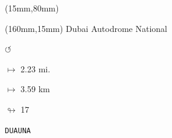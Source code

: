 \begin{textblock*}{185mm}(15mm,80mm)%
\end{textblock*}
\begin{textblock*}{40mm}(160mm,15mm)%
Dubai Autodrome National
\par \Huge$\circlearrowleft$
\Large
\par$\mapsto$ 2.23 mi.
\par$\mapsto$ 3.59 km
\par$\looparrowright$ 17
\par\hfill\tiny\tt DUAUNA\\
\end{textblock*}
\null\newpage

